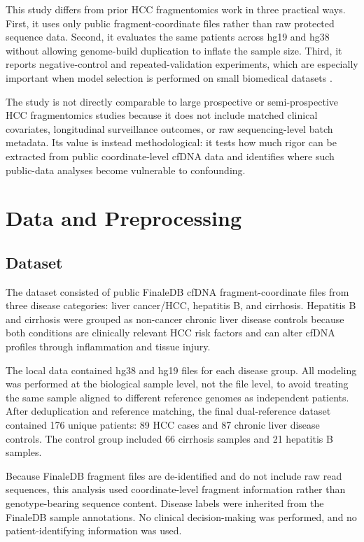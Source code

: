 \documentclass[conference]{IEEEtran}
\begin{document}
This study differs from prior HCC fragmentomics work in three practical ways. First, it uses only public fragment-coordinate files rather than raw protected sequence data. Second, it evaluates the same patients across hg19 and hg38 without allowing genome-build duplication to inflate the sample size. Third, it reports negative-control and repeated-validation experiments, which are especially important when model selection is performed on small biomedical datasets \cite{varma2006bias,collins2015tripod}.

The study is not directly comparable to large prospective or semi-prospective HCC fragmentomics studies because it does not include matched clinical covariates, longitudinal surveillance outcomes, or raw sequencing-level batch metadata. Its value is instead methodological: it tests how much rigor can be extracted from public coordinate-level cfDNA data and identifies where such public-data analyses become vulnerable to confounding.

\section{Data and Preprocessing}
\subsection{Dataset}
The dataset consisted of public FinaleDB cfDNA fragment-coordinate files from three disease categories: liver cancer/HCC, hepatitis B, and cirrhosis. Hepatitis B and cirrhosis were grouped as non-cancer chronic liver disease controls because both conditions are clinically relevant HCC risk factors and can alter cfDNA profiles through inflammation and tissue injury.

The local data contained hg38 and hg19 files for each disease group. All modeling was performed at the biological sample level, not the file level, to avoid treating the same sample aligned to different reference genomes as independent patients. After deduplication and reference matching, the final dual-reference dataset contained 176 unique patients: 89 HCC cases and 87 chronic liver disease controls. The control group included 66 cirrhosis samples and 21 hepatitis B samples.

Because FinaleDB fragment files are de-identified and do not include raw read sequences, this analysis used coordinate-level fragment information rather than genotype-bearing sequence content. Disease labels were inherited from the FinaleDB sample annotations. No clinical decision-making was performed, and no patient-identifying information was used.
\end{document}
